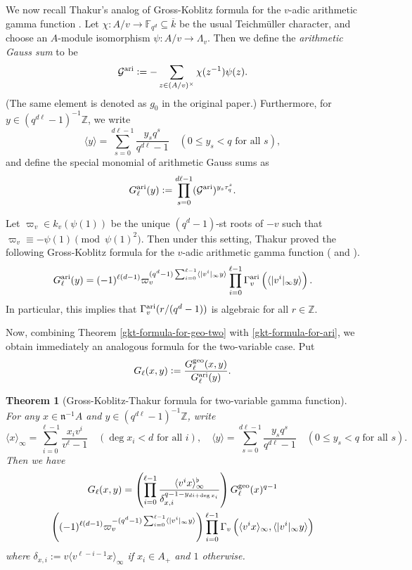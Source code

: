 \documentclass[11pt]{amsart}
\theoremstyle{plain}
\newtheorem{thm}{Theorem}[subsection]
\theoremstyle{definition}
\theoremstyle{remark}
\numberwithin{equation}{section}
\newcommand{\ZZ}{\mathbb{Z}}
\newcommand{\FF}{\mathbb{F}}
\newcommand{\nfk}{\mathfrak{n}}
\newcommand{\Gcal}{\mathcal{G}}
\newcommand{\ovl}{\overline}
\newcommand{\sbe}{\subseteq}
\newcommand{\ang}[1]{\langle #1 \rangle}
\newcommand{\anginf}[1]{\langle #1 \rangle_\infty}
\newcommand{\Fqd}{\FF_{q^d}}
\newcommand{\vag}{\Gamma_v^{\textnormal{ari}}}
\newcommand{\vtg}{\Gamma_v}
\newcommand{\bags}{\Gcal^{\textnormal{ari}}}
\newcommand{\ggs}{G_\l^{\textnormal{geo}}}
\newcommand{\ags}{G_\l^{\textnormal{ari}}}
\let\l\ell
\begin{document}
	We now recall Thakur's analog of Gross-Koblitz formula for the $v$-adic arithmetic gamma function \cite{thakur1988gauss}.
	Let $\chi: A/v \to \Fqd \sbe \ovl{k}$ be the usual Teichmüller character, and choose an $A$-module isomorphism $\psi :A/v \to \Lambda_v$.
	Then we define the \textit{arithmetic Gauss sum} to be
	$$
	\bags
	:= -\sum_{z\in (A/v)^\times} \chi(z^{-1}) \psi(z).
	$$
	(The same element is denoted as $g_0$ in the original paper.)
	Furthermore, for $y \in (q^{d\l}-1)^{-1} \ZZ$, we write
	$$
	\ang{y} = \sum_{s=0}^{d\l-1} \frac{y_s q^s}{q^{d\l}-1}
	\quad
	(0 \leq y_s < q \text{ for all } s),
	$$
	and define the special monomial of arithmetic Gauss sums as
	$$
	\ags(y) := \prod_{s=0}^{d\l-1} (\bags)^{y_s \tau_q^s}.
	$$
	
	Let $\varpi_v \in k_v(\psi(1))$ be the unique $(q^d-1)$-st roots of $-v$ such that $\varpi_v \equiv -\psi(1) \pmod{\psi(1)^2}$.
	Then under this setting, Thakur proved the following Gross-Koblitz formula for the $v$-adic arithmetic gamma function (\cite[Theorem VI]{thakur1988gauss} and \cite[Theorem 4.8]{thakur1991gamma}).
	\begin{equation}    \label{gkt-formula-for-ari}
		\ags(y) = (-1)^{\l(d-1)} \varpi_v^{(q^d-1) \sum_{i=0}^{\l-1} \ang{|v^i|_\infty y}} \prod_{i=0}^{\l-1} \vag\left(\ang{|v^i|_\infty y}\right).
	\end{equation}
	In particular, this implies that $\vag(r/(q^d-1))$ is algebraic for all $r \in \ZZ$.
	
	Now, combining Theorem \ref{gkt-formula-for-geo-two} with \eqref{gkt-formula-for-ari}, we obtain immediately an analogous formula for the two-variable case.
	Put
	$$
	G_\l (x,y) := \frac{\ggs(x,y)}{\ags(y)}.
	$$
	
	\begin{thm}[Gross-Koblitz-Thakur formula for two-variable gamma function]     \label{gkt-formula-for-two-variable-gamma-function}
		For any $x \in \nfk^{-1} A$ and $y \in (q^{d\l}-1)^{-1} \ZZ$, write
		$$
		\anginf{x} = \sum_{i=0}^{\l-1} \frac{x_i v^i}{v^\l-1}
		\quad
		(\deg x_i < d \text{ for all } i),
		\quad
		\ang{y} = \sum_{s=0}^{d\l-1} \frac{y_s q^s}{q^{d\l}-1}
		\quad
		(0 \leq y_s < q \text{ for all } s).
		$$
		Then we have
		\begin{multline*}
			G_{\l} (x,y)
			= \left( \prod_{i=0}^{\l-1}
			\frac{\anginf{v^ix}^\flat}{\delta_{x,i}^{q-1-y_{di+\deg x_i}}} \right)
			\ggs (x)^{q-1} 
			\\
			\left( (-1)^{\l(d-1)} \varpi_v^{-(q^d-1) \sum_{i=0}^{\l-1} \ang{|v^i|_\infty y}} \right)
			\prod_{i=0}^{\l-1} \vtg\left( \anginf{v^ix}, \ang{|v^i|_\infty y} \right)
		\end{multline*}
		where $\delta_{x,i} := v\anginf{v^{\l-i-1}x}$ if $x_i \in A_+$ and $1$ otherwise.
	\end{thm}
	
\end{document}
